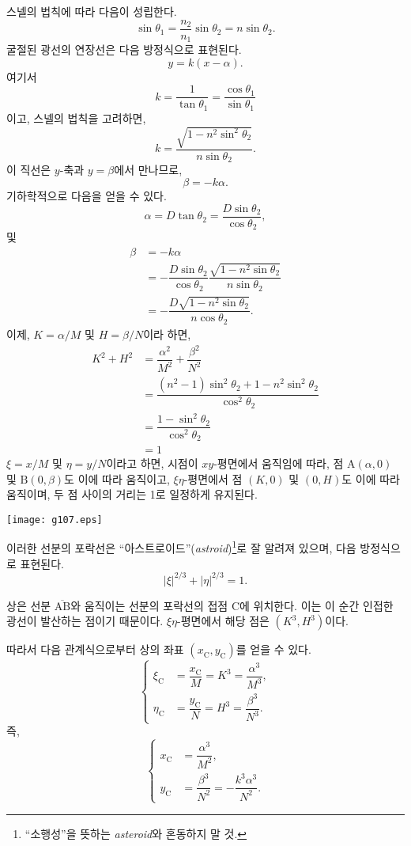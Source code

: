 \documentclass[twocolumn]{article}
\begin{document}
	스넬의 법칙에 따라 다음이 성립한다.
	$$ \sin\theta_1 = \frac{n_2}{n_1} \sin\theta_2 = n\sin\theta_2.$$
	굴절된 광선의 연장선은 다음 방정식으로 표현된다.
	$$y=k(x-\alpha).$$
	여기서 
	$$k=\dfrac{1}{\tan\theta_1}=\dfrac{\cos\theta_1}{\sin\theta_1}$$
	이고, 스넬의 법칙을 고려하면,
	$$k=\dfrac{\sqrt{1-n^2\sin^2\theta_2}}{n\sin\theta_2}.$$
	이 직선은 $y$-축과 $y=\beta$에서 만나므로,
	$$\beta = -k\alpha.$$
	기하학적으로 다음을 얻을 수 있다.
	$$\alpha = D\tan\theta_2 = \dfrac{D\sin\theta_2}{\cos\theta_2},$$
	및
	$$\begin{aligned}
		\beta &= -k\alpha \\
		&= -\dfrac{D\sin\theta_2}{\cos\theta_2}
		\dfrac{\sqrt{1-n^2\sin\theta_2}}{n\sin\theta_2}\\
		&=-\dfrac{D\sqrt{1-n^2\sin\theta_2}}{n\cos\theta_2}.
	\end{aligned}$$
	이제, $K=\alpha/M$ 및 $H=\beta/N$이라 하면,
	$$ \begin{aligned}
		K^2 + H^2 &= \dfrac{\alpha^2}{M^2}+\dfrac{\beta^2}{N^2}\\
		&=\dfrac{\left(n^2-1\right)\sin^2\theta_2 + 1-n^2\sin^2\theta_2}
		{\cos^2\theta_2}\\
		&=\dfrac{1-\sin^2\theta_2}{\cos^2\theta_2}\\
		&=1
	\end{aligned}$$
	$\xi=x/M$ 및 $\eta=y/N$이라고 하면, 시점이 $xy$-평면에서 움직임에 따라,
	점 $\mathrm{A}(\alpha, 0)$ 및 $\mathrm{B}(0, \beta)$도 이에 따라 움직이고, 
	$\xi\eta$-평면에서 점 $(K, 0)$ 및 $(0, H)$도 이에 따라 움직이며, 
	두 점 사이의 거리는 1로 일정하게 유지된다.
	
	\texttt{[image: g107.eps]}
	
	이러한 선분의 포락선은 ``아스트로이드''(\emph{astroid})\footnote{
		``소행성''을 뜻하는 \emph{asteroid}와 혼동하지 말 것.}로 잘 알려져 있으며, 
	다음 방정식으로 표현된다.
	$$ \left| \xi \right|^{2/3} + \left| \eta \right|^{2/3} = 1. $$
	
	상은 선분 $\overline{\mathrm{AB}}$와 움직이는 선분의 포락선의 접점 $\mathrm{C}$에 위치한다. 
	이는 이 순간 인접한 광선이 발산하는 점이기 때문이다. 
	$\xi\eta$-평면에서 해당 점은 $(K^3, H^3)$이다.
	
	따라서 다음 관계식으로부터 상의 좌표 $(x_{\mathrm{C}}^{}, y_{\mathrm{C}}^{})$를 얻을 수 있다.
	$$ \left\{ 
	\begin{aligned}
		\xi_{\mathrm{C}}^{} &= \dfrac{x_{\mathrm{C}}^{}}{M} = K^3 = \dfrac{\alpha^3}{M^3},\\
		\eta_{\mathrm{C}}^{} &= \dfrac{y_{\mathrm{C}}^{}}{N} = H^3 = \dfrac{\beta^3}{N^3}.
	\end{aligned}
	\right.$$
	즉,
	$$ \left\{ 
	\begin{aligned}
		x_{\mathrm{C}}^{} &= \dfrac{\alpha^3}{M^2},\\
		y_{\mathrm{C}}^{} &= \dfrac{\beta^3}{N^2}=-\dfrac{k^3\alpha^3}{N^2}.
	\end{aligned}
	\right.$$
	
\end{document}
